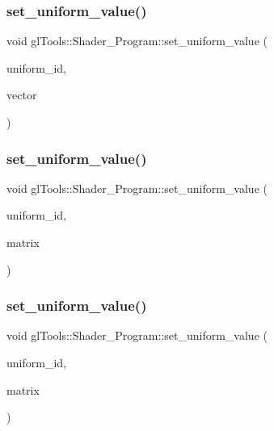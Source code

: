\mbox{\label{classgl_tools_1_1_shader___program_a806d1d95e36fa03a6caf7bd0f27505c3}} 
\subsubsection{set\_uniform\_value()\hspace{0.1cm}{\footnotesize\ttfamily [5/8]}}
{\footnotesize\ttfamily void gl\+Tools\+::\+Shader\+\_\+\+Program\+::set\+\_\+uniform\+\_\+value (\begin{DoxyParamCaption}\item[{G\+Lint}]{uniform\+\_\+id,  }\item[{const Vector4f \&}]{vector }\end{DoxyParamCaption})\hspace{0.3cm}{\ttfamily [inline]}}

\mbox{\label{classgl_tools_1_1_shader___program_a98199e6487faa4a45c03b460b95dad4e}} 
\subsubsection{set\_uniform\_value()\hspace{0.1cm}{\footnotesize\ttfamily [6/8]}}
{\footnotesize\ttfamily void gl\+Tools\+::\+Shader\+\_\+\+Program\+::set\+\_\+uniform\+\_\+value (\begin{DoxyParamCaption}\item[{G\+Lint}]{uniform\+\_\+id,  }\item[{const Matrix22f \&}]{matrix }\end{DoxyParamCaption})\hspace{0.3cm}{\ttfamily [inline]}}

\mbox{\label{classgl_tools_1_1_shader___program_af369a84d658772a93d468a781ea79633}} 
\subsubsection{set\_uniform\_value()\hspace{0.1cm}{\footnotesize\ttfamily [7/8]}}
{\footnotesize\ttfamily void gl\+Tools\+::\+Shader\+\_\+\+Program\+::set\+\_\+uniform\+\_\+value (\begin{DoxyParamCaption}\item[{G\+Lint}]{uniform\+\_\+id,  }\item[{const Matrix33f \&}]{matrix }\end{DoxyParamCaption})\hspace{0.3cm}{\ttfamily [inline]}}


